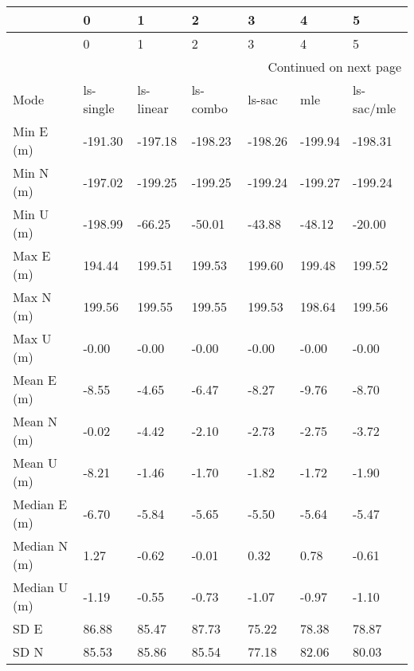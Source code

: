 \begin{longtable}{lllllll}
\toprule
{} &          0 &          1 &         2 &        3 &        4 &           5 \\
\midrule
\endfirsthead

\toprule
{} &          0 &          1 &         2 &        3 &        4 &           5 \\
\midrule
\endhead
\midrule
\multicolumn{7}{r}{{Continued on next page}} \\
\midrule
\endfoot

\bottomrule
\endlastfoot
Mode              &  ls-single &  ls-linear &  ls-combo &   ls-sac &      mle &  ls-sac/mle \\
Min E (m)         &    -191.30 &    -197.18 &   -198.23 &  -198.26 &  -199.94 &     -198.31 \\
Min N (m)         &    -197.02 &    -199.25 &   -199.25 &  -199.24 &  -199.27 &     -199.24 \\
Min U (m)         &    -198.99 &     -66.25 &    -50.01 &   -43.88 &   -48.12 &      -20.00 \\
Max E (m)         &     194.44 &     199.51 &    199.53 &   199.60 &   199.48 &      199.52 \\
Max N (m)         &     199.56 &     199.55 &    199.55 &   199.53 &   198.64 &      199.56 \\
Max U (m)         &      -0.00 &      -0.00 &     -0.00 &    -0.00 &    -0.00 &       -0.00 \\
Mean E (m)        &      -8.55 &      -4.65 &     -6.47 &    -8.27 &    -9.76 &       -8.70 \\
Mean N (m)        &      -0.02 &      -4.42 &     -2.10 &    -2.73 &    -2.75 &       -3.72 \\
Mean U (m)        &      -8.21 &      -1.46 &     -1.70 &    -1.82 &    -1.72 &       -1.90 \\
Median E (m)      &      -6.70 &      -5.84 &     -5.65 &    -5.50 &    -5.64 &       -5.47 \\
Median N (m)      &       1.27 &      -0.62 &     -0.01 &     0.32 &     0.78 &       -0.61 \\
Median U (m)      &      -1.19 &      -0.55 &     -0.73 &    -1.07 &    -0.97 &       -1.10 \\
SD E              &      86.88 &      85.47 &     87.73 &    75.22 &    78.38 &       78.87 \\
SD N              &      85.53 &      85.86 &     85.54 &    77.18 &    82.06 &       80.03 \\

\end{longtable}
